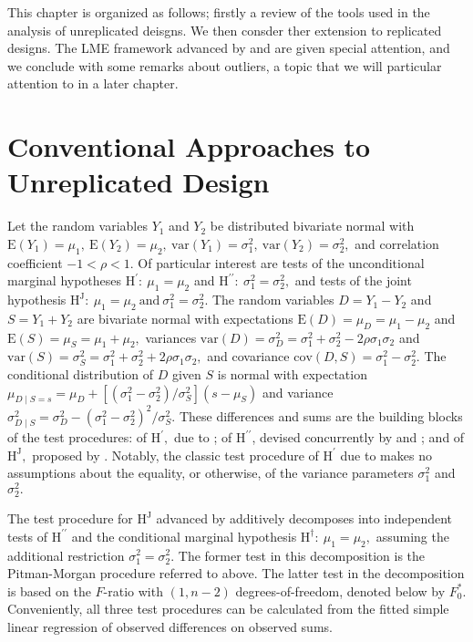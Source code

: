 \documentclass[12pt, a4paper]{report}
\theoremstyle{plain}
\theoremstyle{definition}
\theoremstyle{remark}
\begin{document}

This chapter is organized as follows; firstly a review of the tools used in the analysis of unreplicated deisgns. We then consder ther extension to replicated designs. The LME framework advanced by \citet{BXC2008} and \citet{ARoy2009} are given special attention, and we conclude with some remarks about outliers, a topic that we will particular attention to in a later chapter.





\section{Conventional Approaches to Unreplicated Design}  
Let the random variables $Y_1$ and $Y_2$ be distributed bivariate normal with $\mathrm{E}(Y_1)=\mu_1,\ \mathrm{E}(Y_2)=\mu_2,\ \mathrm{var}(Y_1)=\sigma^2_1,\ \mathrm{var}(Y_2)=\sigma^2_2,$ and correlation coefficient $-1<\rho<1.$ Of particular interest are tests of the unconditional marginal hypotheses $\textrm{H}^\prime\colon~\mu_1 = \mu_2$ and $\textrm{H}^{\prime\prime}\colon~\sigma^2_1 = \sigma^2_2,$ and tests of the joint hypothesis $\textrm{H}^\mathrm{J}\colon~\mu_1 = \mu_2\ \textrm{and}\ \sigma^2_1 = \sigma^2_2.$ The random variables $D=Y_1-Y_2$ and $S=Y_1+Y_2$ are bivariate normal with expectations $\mathrm{E}(D) = \mu_D = \mu_1- \mu_2$ and $\mathrm{E}(S) = \mu_S = \mu_1+ \mu_2,$ variances $\mathrm{var}(D) = \sigma^2_D = \sigma_1^2 + \sigma_2^2 - 2 \rho \sigma_1 \sigma_2$ and $\mathrm{var}(S) = \sigma^2_S = \sigma_1^2 + \sigma_2^2 + 2 \rho \sigma_1 \sigma_2,$ and covariance $\mathrm{cov}(D,S) = \sigma_1^2 - \sigma_2^2.$ The conditional distribution of $D$ given $S$ is normal with expectation $\mu_{D\mid S=s} = \mu_D + [ ( \sigma^2_1 - \sigma^2_2 ) / \sigma^2_S ] ( s - \mu_S )$ and variance $\sigma^2_{D\mid S} = \sigma^2_D - ( \sigma^2_1 - \sigma^2_2 )^2 / \sigma^2_S.$ These differences and sums are the building blocks of the test procedures: of $\textrm{H}^\prime,$ due to \cite{Student}; of $\textrm{H}^{\prime\prime}$, devised concurrently by \cite{pitman} and \cite{morgan}; and of $\textrm{H}^\mathrm{J},$ proposed by \citet{BB89}. Notably, the classic test procedure of $\textrm{H}^\prime$ due to \cite{Student} makes no assumptions about the equality, or otherwise, of the variance parameters $\sigma^2_1$ and $\sigma^2_2.$

The test procedure for $\textrm{H}^\mathrm{J}$ advanced by \citet{BB89} additively decomposes into independent tests of $\textrm{H}^{\prime\prime}$ and the conditional marginal hypothesis $\textrm{H}^\dag\colon~\mu_1 = \mu_2,$ assuming the additional restriction $\sigma^2_1 = \sigma^2_2.$  The former test in this decomposition is the Pitman-Morgan procedure referred to above. The latter test in the decomposition is based on the $F$-ratio with $(1,n-2)$ degrees-of-freedom, denoted below by $F_0^\ast.$ Conveniently, all three test procedures can be calculated from the fitted simple linear regression of observed differences on observed sums. 
\end{document}

